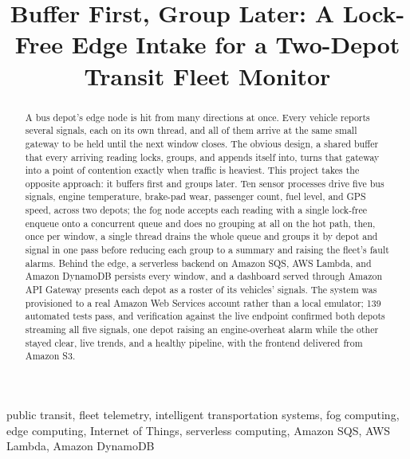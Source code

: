 \documentclass[conference]{IEEEtran}
\begin{document}
\title{Buffer First, Group Later: A Lock-Free Edge Intake for a Two-Depot Transit Fleet Monitor}

\author{
}

\maketitle

\begin{abstract}
A bus depot's edge node is hit from many directions at once. Every vehicle reports several signals, each on its own thread, and all of them arrive at the same small gateway to be held until the next window closes. The obvious design, a shared buffer that every arriving reading locks, groups, and appends itself into, turns that gateway into a point of contention exactly when traffic is heaviest. This project takes the opposite approach: it buffers first and groups later. Ten sensor processes drive five bus signals, engine temperature, brake-pad wear, passenger count, fuel level, and GPS speed, across two depots; the fog node accepts each reading with a single lock-free enqueue onto a concurrent queue and does no grouping at all on the hot path, then, once per window, a single thread drains the whole queue and groups it by depot and signal in one pass before reducing each group to a summary and raising the fleet's fault alarms. Behind the edge, a serverless backend on Amazon SQS, AWS Lambda, and Amazon DynamoDB persists every window, and a dashboard served through Amazon API Gateway presents each depot as a roster of its vehicles' signals. The system was provisioned to a real Amazon Web Services account rather than a local emulator; 139 automated tests pass, and verification against the live endpoint confirmed both depots streaming all five signals, one depot raising an engine-overheat alarm while the other stayed clear, live trends, and a healthy pipeline, with the frontend delivered from Amazon S3.
\end{abstract}

\begin{IEEEkeywords}
public transit, fleet telemetry, intelligent transportation systems, fog computing, edge computing, Internet of Things, serverless computing, Amazon SQS, AWS Lambda, Amazon DynamoDB
\end{IEEEkeywords}
\end{document}
